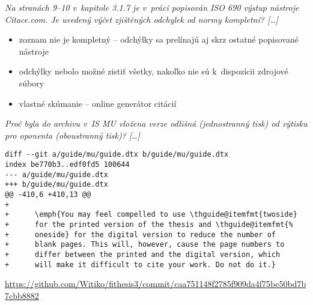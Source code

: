 \documentclass{beamer}
\begin{document}
\begin{frame}
\emph{Na stranách 9--10 v~kapitole 3.1.7 je v~práci popisován ISO 690 výstup nástroje Citace.com. Je uvedený výčet zjištěných odchylek od normy kompletní? [\dots]} %
\medskip\par
\begin{itemize}
\item zoznam nie je kompletný -- odchýlky sa prelínajú aj skrz ostatné popisované nástroje
\item odchýlky nebolo možné zistiť všetky, nakoľko nie sú k~dispozícii zdrojové súbory
\item vlastné skúmanie -- online generátor citácií
\end{itemize}
\end{frame}

\begin{frame}[fragile]
\emph{Proč byla do archivu v~IS MU vložena verze odlišná (jednostranný tisk) od výtisku
pro oponenta (oboustranný tisk)? [\dots]}
\medskip\par
\begin{verbatim}
diff --git a/guide/mu/guide.dtx b/guide/mu/guide.dtx
index be770b3..edf0fd5 100644
--- a/guide/mu/guide.dtx
+++ b/guide/mu/guide.dtx
@@ -410,6 +410,13 @@
+
+      \emph{You may feel compelled to use \thguide@itemfmt{twoside}
+      for the printed version of the thesis and \thguide@itemfmt{%
+      oneside} for the digital version to reduce the number of
+      blank pages. This will, however, cause the page numbers to
+      differ between the printed and the digital version, which
+      will make it difficult to cite your work. Do not do it.}
\end{verbatim}
\url{https://github.com/Witiko/fithesis3/commit/caa751148f2785f909da4f75be50bd7b7cbb8882}
\end{frame}


\end{document}
